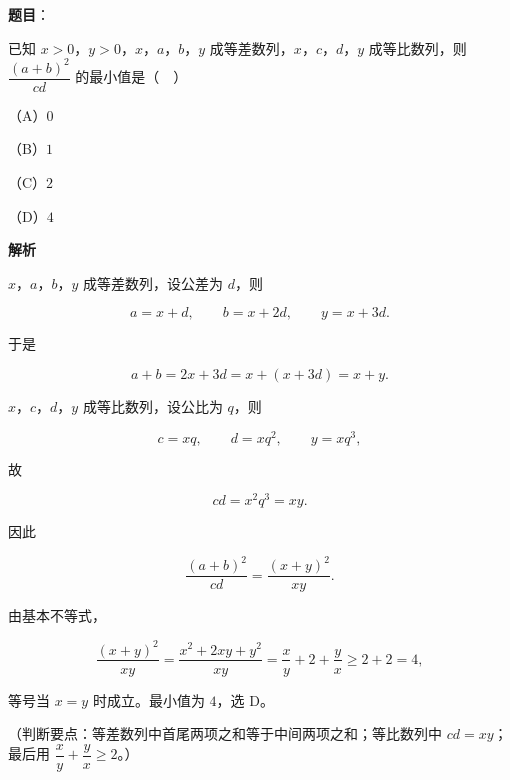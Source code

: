 \begin{answer}

\textbf{题目}：

已知 $x>0$，$y>0$，$x$，$a$，$b$，$y$ 成等差数列，$x$，$c$，$d$，$y$ 成等比数列，则 $\dfrac{(a+b)^2}{cd}$ 的最小值是（　）

（A）$0$

（B）$1$

（C）$2$

（D）$4$

\textbf{解析}

$x$，$a$，$b$，$y$ 成等差数列，设公差为 $d$，则

\nopagebreak[4]
\[a=x+d,\qquad b=x+2d,\qquad y=x+3d.\]

于是

\nopagebreak[4]
\[a+b=2x+3d=x+(x+3d)=x+y.\]

$x$，$c$，$d$，$y$ 成等比数列，设公比为 $q$，则

\nopagebreak[4]
\[c=xq,\qquad d=xq^2,\qquad y=xq^3,\]

故

\nopagebreak[4]
\[cd=x^2q^3=xy.\]

因此

\nopagebreak[4]
\[\frac{(a+b)^2}{cd}=\frac{(x+y)^2}{xy}.\]

由基本不等式，

\nopagebreak[4]
\[\frac{(x+y)^2}{xy}=\frac{x^2+2xy+y^2}{xy}=\frac xy+2+\frac yx\geqslant2+2=4,\]

等号当 $x=y$ 时成立。最小值为 $4$，选 D。

（判断要点：等差数列中首尾两项之和等于中间两项之和；等比数列中 $cd=xy$；最后用 $\dfrac xy+\dfrac yx\geqslant2$。）


\end{answer}

